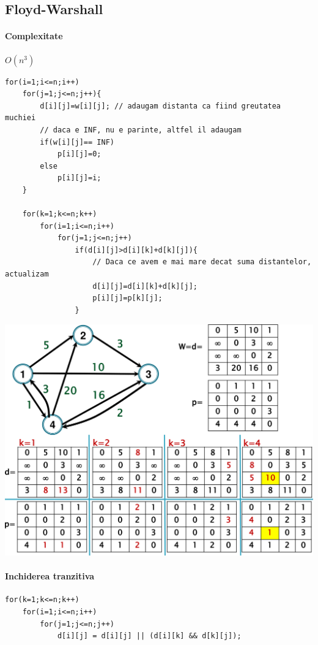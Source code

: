 \documentclass{article}
\begin{document}
\subsection*{Floyd-Warshall}
\paragraph*{Complexitate} $O(n^3)$

\begin{lstlisting}
for(i=1;i<=n;i++)
    for(j=1;j<=n;j++){
        d[i][j]=w[i][j]; // adaugam distanta ca fiind greutatea muchiei
        // daca e INF, nu e parinte, altfel il adaugam
        if(w[i][j]== INF)
            p[i][j]=0;
        else
            p[i][j]=i;
    }

    for(k=1;k<=n;k++)
        for(i=1;i<=n;i++)
            for(j=1;j<=n;j++)
                if(d[i][j]>d[i][k]+d[k][j]){ 
                    // Daca ce avem e mai mare decat suma distantelor, actualizam
                    d[i][j]=d[i][k]+d[k][j];
                    p[i][j]=p[k][j];
                }
   \end{lstlisting}

\begin{center}
    \includegraphics[scale=0.3]{9_floydwarshall.png}
\end{center}

\paragraph*{Inchiderea tranzitiva}
\begin{center}
    \begin{lstlisting}
for(k=1;k<=n;k++)
    for(i=1;i<=n;i++)
        for(j=1;j<=n;j++)
            d[i][j] = d[i][j] || (d[i][k] && d[k][j]);
        \end{lstlisting}
\end{center}
\end{document}
